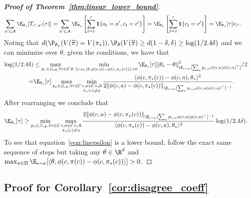 \documentclass{article}
\newcommand{\mc}[1]{\mathcal{#1}}
\newcommand{\lalit}[1]{\textcolor{blue}{}}
\newcommand{\1}{\mathbf{1}}
\begin{document}
\begin{proof}[\textbf{Proof of Theorem~\ref{thm:linear_lower_bound}}]
\begin{align*}
    \sum_{a' \in \mc{A}} \E_{\theta_*}[ T_{c',a'} (\tau) ] &= \sum_{a' \in \mc{A}} \E_{\theta_*}\left[ \sum_{t=1}^\tau \1\{ a_t = a', c_t = c' \} \right] = \E_{\theta_*}\left[ \sum_{t=1}^\tau \1\{ c_t = c' \} \right] = \E_{\theta_*}[\tau] \nu_{c'}.
\end{align*}
Noting that $d( \P_{\theta_*}( V(\widehat{\pi}) = V(\pi_*) ), \P_{\theta}( V(\widehat{\pi}) \geq d(1-\delta,\delta) \geq \log(1/2.4 \delta)$ and we can minimize over $\theta$, given the conditions, we have that \lalit{Need a sentence about why this is an alternative - basically $\arg\max_{\pi\in\Pi} V_\theta(\pi) = \pi_{\theta}$}
\begin{align*}
    \log(1/2.4\delta) &\leq \max_{p_c \in \triangle_{\mc{A}}, \forall c \in \mc{C}} \min_{\theta: \exists c :\nu_c \langle \theta, \phi(c,a) - \phi(c,\pi_*(c))\rangle > 0} \E_{\theta_*}[\tau]  \| \theta_* - \theta \|_{\E_{c \sim \nu}[ \sum_{a} p_{c,a} \phi(c,a) \phi(c,a)^\top]}^2 /2 \\
    =& \E_{\theta_*}[\tau] \max_{p_c \in \triangle_{\mc{A}}, \forall c \in \mc{C}}\min_{\substack{c,a\in \mathcal{C}\times \mathcal{A}\\ \pi_{\ast}(c)\neq a}} \frac{\langle \phi(c,\pi_*(c)) - \phi(c,a), \theta_* \rangle^2 }{2 \| \phi(c,a) - \phi(c,\pi_*(c)) \|_{\E_{c \sim \nu}[ \sum_{a} p_{c,a} \phi(c,a) \phi(c,a)^\top]^{-1}}}.
\end{align*}
After rearranging we conclude that 
\begin{align*}
    \E_{\theta_*}[\tau] \geq  \min_{p_c \in \triangle_{\mc{A}}, \forall c \in \mc{C}}\max_{\substack{ c,a\in \mathcal{C}\times \mathcal{A}\\ \pi_{\ast}(c)\neq a}} \frac{2 \| \phi(c,a) - \phi(c,\pi_*(c)) \|_{\E_{c \sim \nu}[ \sum_{a} p_{c,a} \phi(c,a) \phi(c,a)^\top]^{-1}}}{\langle \phi(c,\pi_*(c)) - \phi(c,a), \theta_* \rangle^2 } \log(1/2.4 \delta).
\end{align*}
To see that equation~\eqref{eqn:linepsilon} is a lower bound, follow the exact same sequence of steps but taking any $\theta \in \R^d$ and $\max_{\pi\in\Pi} \E_{c \sim \nu}[ \langle \theta, \phi(c,\pi(c)) - \phi(c,\pi_*(c)) \rangle ] > 0$.
\end{proof}

\subsection{Proof for Corollary~\ref{cor:disagree_coeff}}\label{sec:proof_dis_coeff}
\end{document}
